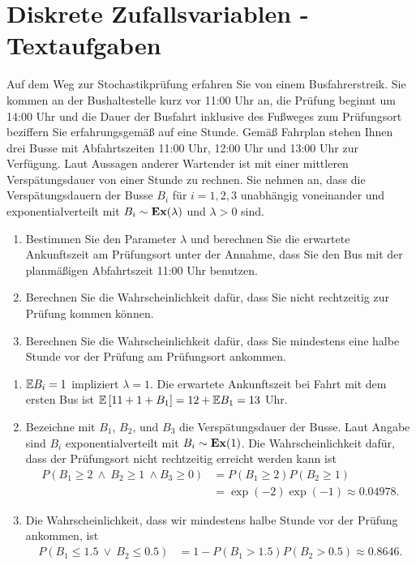\section{Diskrete Zufallsvariablen - Textaufgaben} 

 Auf dem Weg zur Stochastikprüfung erfahren Sie von
einem Busfahrerstreik. Sie kommen an der Bushaltestelle kurz vor 11:00 Uhr an,
die Prüfung beginnt um 14:00 Uhr und die Dauer der Busfahrt inklusive des
Fußweges zum Prüfungsort beziffern Sie erfahrungsgemäß auf eine Stunde. Gemäß
Fahrplan stehen Ihnen drei Busse mit Abfahrtszeiten 11:00 Uhr, 12:00 Uhr und 13:00 Uhr zur
Verfügung. Laut Aussagen anderer Wartender ist mit einer mittleren
Verspätungsdauer von einer Stunde zu rechnen. Sie nehmen an, dass die
Verspätungsdauern der Busse $B_i$  f\"ur $i=1,2,3$ unabhängig voneinander und exponentialverteilt mit $B_i \sim \mathbf{Ex}(\lambda)$ und
$\lambda>0$ sind. 
\begin{enumerate}
    \item Bestimmen Sie den Parameter $\lambda$ und berechnen Sie die erwartete
        Ankunftszeit am Prüfungsort unter der Annahme, dass Sie den Bus mit der
        planmäßigen Abfahrtszeit 11:00 Uhr benutzen.
    \item Berechnen Sie die Wahrscheinlichkeit dafür, dass Sie nicht rechtzeitig 
        zur Prüfung kommen können.
    \item Berechnen Sie die Wahrscheinlichkeit dafür, dass Sie mindestens eine halbe Stunde
        vor der Prüfung am Prüfungsort ankommen.
\end{enumerate}

\solution
\begin{enumerate}
    \item $\mathbb{E} B_i = 1$ impliziert $\lambda=1$. Die erwartete Ankunftszeit bei
        Fahrt mit dem ersten Bus ist $\mathbb{E} \left[ 11 + 1 + B_1  \right] = 12 +
        \mathbb{E} B_1 = 13$ Uhr.
    \item Bezeichne mit $B_1$, $B_2$, und $B_3$ die Verspätungsdauer der Busse.
        Laut Angabe sind $B_i$ exponentialverteilt mit  $B_i \sim
        \mathbf{Ex}(1)$. Die Wahrscheinlichkeit dafür, dass der Prüfungsort nicht
        rechtzeitig erreicht werden kann ist
        \begin{align*}
            P\left( B_1 \geq 2 \ \wedge \ B_2 \geq 1 \ \wedge B_3 \geq 0 \right) &= 
            P(B_1 \geq 2) P(B_2 \geq 1) \\
            &= \exp\left( -2 \right) \exp( -1) \approx 0.04978.
        \end{align*}

    \item Die Wahrscheinlichkeit, dass wir mindestens halbe Stunde vor der
        Prüfung ankommen, ist
        \begin{align*}
            P( B_1 \leq 1.5 \ \vee \ B_2 \leq 0.5  ) &= 1 - P(B_1 > 1.5 )P(B_2 > 0.5) 
            \approx 0.8646. 
        \end{align*}
\end{enumerate}


